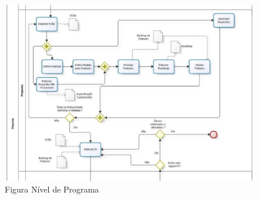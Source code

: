 \begin{figure}[h]
    \centering
    \label{fig01}
        \includegraphics[keepaspectratio=true,scale=0.5]{figuras/nivelProgramaRequisitos.eps}
    \caption{Figura Nível de Programa}
\end{figure}

